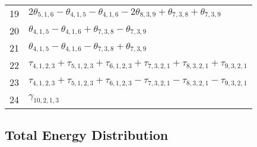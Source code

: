 \documentclass[10pt,oneside]{article}
\begin{document}
\begin{table}[h!]
\begin{tabular}{ll}
  19  & $2\theta_{5,1,6} - \theta_{4,1,5} - \theta_{4,1,6} - 2\theta_{8,3,9} + \theta_{7,3,8} + \theta_{7,3,9}$ \\
  20  & $\theta_{4,1,5} - \theta_{4,1,6} + \theta_{7,3,8} - \theta_{7,3,9}$ \\
  21  & $\theta_{4,1,5} - \theta_{4,1,6} - \theta_{7,3,8} + \theta_{7,3,9}$ \\
  22  & $\tau_{4,1,2,3} + \tau_{5,1,2,3} + \tau_{6,1,2,3} + \tau_{7,3,2,1} + \tau_{8,3,2,1} + \tau_{9,3,2,1}$ \\
  23  & $\tau_{4,1,2,3} + \tau_{5,1,2,3} + \tau_{6,1,2,3} - \tau_{7,3,2,1} - \tau_{8,3,2,1} - \tau_{9,3,2,1}$ \\
  24  & $\gamma_{10,2,1,3}$ \\
\bottomrule
\end{tabular}
\end{table}

\begin{table}
\subsection*{Total Energy Distribution}
\centering\end{table}

\clearpage

\subsection{}
\end{document}
